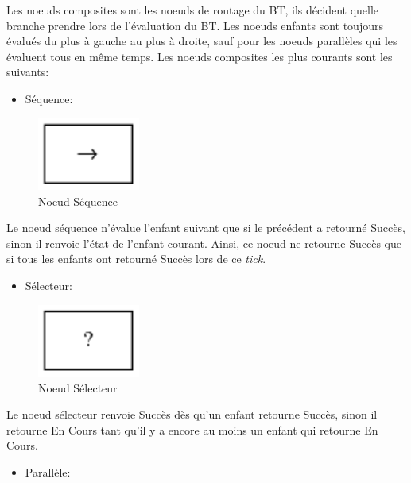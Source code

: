 \documentclass[11pt]{article}
\begin{document}
\begin{enumerate}
Les noeuds composites sont les noeuds de routage du BT, ils décident quelle branche prendre lors de l'évaluation du BT.
Les noeuds enfants sont toujours évalués du plus à gauche au plus à droite, sauf pour les noeuds parallèles qui les évaluent tous en même temps.
Les noeuds composites les plus courants sont les suivants:



\clearpage
\begin{itemize}
\item Séquence:
\end{itemize}


\begin{figure}[htb]
\centering
\includegraphics[width=0.3\textwidth]{./img/Sequence.png}
\caption{Noeud Séquence}
\end{figure}

Le noeud séquence n'évalue l'enfant suivant que si le précédent a retourné Succès, sinon il renvoie l'état de l'enfant courant.
Ainsi, ce noeud ne retourne Succès que si tous les enfants ont retourné Succès lors de ce \emph{tick}.

\begin{itemize}
\item Sélecteur:
\end{itemize}


\begin{figure}[htb]
\centering
\includegraphics[width=0.3\textwidth]{./img/Selector.png}
\caption{Noeud Sélecteur}
\end{figure}

Le noeud sélecteur renvoie Succès dès qu'un enfant retourne Succès, sinon il retourne En Cours tant qu'il y a encore au moins un enfant qui retourne En Cours.



\clearpage
\begin{itemize}
\item Parallèle:
\end{itemize}



\end{enumerate}
\end{document}
